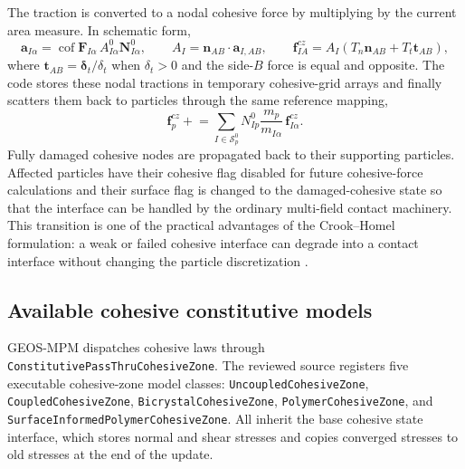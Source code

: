 The traction is converted to a nodal cohesive force by multiplying by the current area measure.  In schematic form,
\begin{equation}
  \mathbf{a}_{I\alpha}
  = \operatorname{cof}\mathbf{F}_{I\alpha}\,A^0_{I\alpha}\mathbf{N}^0_{I\alpha},
  \qquad
  A_I = \mathbf{n}_{AB}\cdot\mathbf{a}_{I,AB},
  \qquad
  \mathbf{f}^{cz}_{IA}=A_I\left(T_n\mathbf{n}_{AB}+T_t\mathbf{t}_{AB}\right),
  \label{eq:cz-traction-force}
\end{equation}
where $\mathbf{t}_{AB}=\boldsymbol{\delta}_t/\delta_t$ when $\delta_t>0$ and the side-$B$ force is equal and opposite.  The code stores these nodal tractions in temporary cohesive-grid arrays and finally scatters them back to particles through the same reference mapping,
\begin{equation}
  \mathbf{f}^{cz}_p \mathrel{+}= \sum_{I\in\mathcal{S}_p^0}
      N^0_{Ip}\frac{m_p}{m_{I\alpha}}\,\mathbf{f}^{cz}_{I\alpha}.
  \label{eq:cz-grid-to-particle}
\end{equation}
Fully damaged cohesive nodes are propagated back to their supporting particles.  Affected particles have their cohesive flag disabled for future cohesive-force calculations and their surface flag is changed to the damaged-cohesive state so that the interface can be handled by the ordinary multi-field contact machinery.  This transition is one of the practical advantages of the Crook--Homel formulation: a weak or failed cohesive interface can degrade into a contact interface without changing the particle discretization \cite{crook2025cohesive}.

\subsection{Available cohesive constitutive models}

GEOS-MPM dispatches cohesive laws through \texttt{ConstitutivePassThruCohesiveZone}.  The reviewed source registers five executable cohesive-zone model classes: \texttt{UncoupledCohesiveZone}, \texttt{CoupledCohesiveZone}, \texttt{BicrystalCohesiveZone}, \texttt{PolymerCohesiveZone}, and \texttt{SurfaceInformedPolymerCohesiveZone}.  All inherit the base cohesive state interface, which stores normal and shear stresses and copies converged stresses to old stresses at the end of the update.

